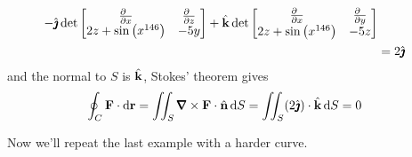 \begin{eg}
\begin{align*}
   -\hj\det\left[\begin{matrix}
                         \frac{\partial\hfill}{\partial x} &
                         \frac{\partial\hfill}{\partial z} \\
                              2z+\sin\big(x^{146}\big)   & -5y
                               \end{matrix}\right] 
   +\hk\det\left[\begin{matrix}
                         \frac{\partial\hfill}{\partial x} &
                         \frac{\partial\hfill}{\partial y}  \\
                              2z+\sin\big(x^{146}\big)  &  -5z  
                               \end{matrix}\right]\\
  &=2\hj
\end{align*}
and the normal to $S$ is $\hat{\mathbf{k}}$,
Stokes' theorem gives
\begin{align*}
\oint_C\vF\cdot\dee{\vr}
& = \dblInt_S \vnabla\times\vF\cdot\hn\,\dee{S}
=  \dblInt_S (2\hj)\cdot\hk\,\dee{S}
=0
\end{align*}

\end{eg}

Now we'll repeat the last example with a harder curve.

